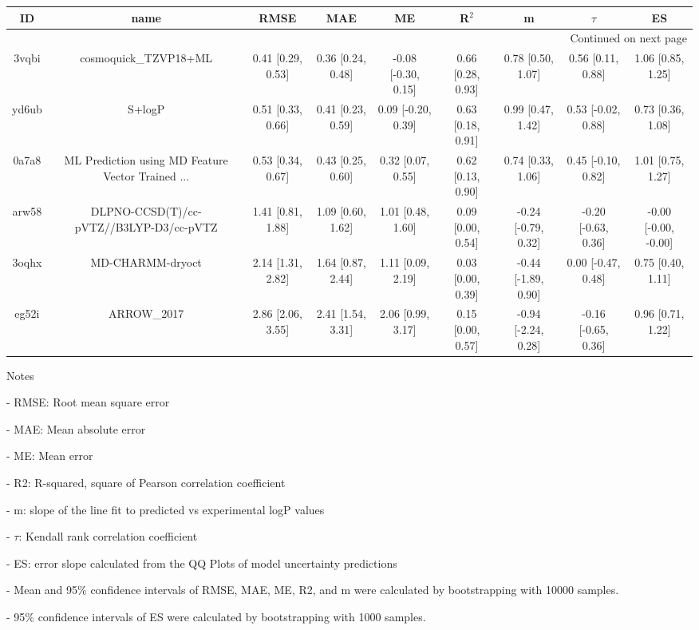 \documentclass{article}
\begin{document}
\begin{center}
\scriptsize
\begin{longtable}{|ccccccccc|}
\toprule
    ID &                                               name &               RMSE &                MAE &                   ME &              R$^2$ &                    m &               $\tau$ &                    ES \\
\midrule
\endhead
\midrule
\multicolumn{9}{r}{{Continued on next page}} \\
\midrule
\endfoot

\bottomrule
\endlastfoot
 3vqbi &                              cosmoquick\_TZVP18+ML &  0.41 [0.29, 0.53] &  0.36 [0.24, 0.48] &  -0.08 [-0.30, 0.15] &  0.66 [0.28, 0.93] &    0.78 [0.50, 1.07] &    0.56 [0.11, 0.88] &     1.06 [0.85, 1.25] \\
 yd6ub &                                             S+logP &  0.51 [0.33, 0.66] &  0.41 [0.23, 0.59] &   0.09 [-0.20, 0.39] &  0.63 [0.18, 0.91] &    0.99 [0.47, 1.42] &   0.53 [-0.02, 0.88] &     0.73 [0.36, 1.08] \\
 0a7a8 &  ML Prediction using MD Feature Vector Trained ... &  0.53 [0.34, 0.67] &  0.43 [0.25, 0.60] &    0.32 [0.07, 0.55] &  0.62 [0.13, 0.90] &    0.74 [0.33, 1.06] &   0.45 [-0.10, 0.82] &     1.01 [0.75, 1.27] \\
 arw58 &            DLPNO-CCSD(T)/cc-pVTZ//B3LYP-D3/cc-pVTZ &  1.41 [0.81, 1.88] &  1.09 [0.60, 1.62] &    1.01 [0.48, 1.60] &  0.09 [0.00, 0.54] &  -0.24 [-0.79, 0.32] &  -0.20 [-0.63, 0.36] &  -0.00 [-0.00, -0.00] \\
 3oqhx &                                   MD-CHARMM-dryoct &  2.14 [1.31, 2.82] &  1.64 [0.87, 2.44] &    1.11 [0.09, 2.19] &  0.03 [0.00, 0.39] &  -0.44 [-1.89, 0.90] &   0.00 [-0.47, 0.48] &     0.75 [0.40, 1.11] \\
 eg52i &                                        ARROW\_2017 &  2.86 [2.06, 3.55] &  2.41 [1.54, 3.31] &    2.06 [0.99, 3.17] &  0.15 [0.00, 0.57] &  -0.94 [-2.24, 0.28] &  -0.16 [-0.65, 0.36] &     0.96 [0.71, 1.22] \\
\end{longtable}
\end{center}

Notes

- RMSE: Root mean square error

- MAE: Mean absolute error

- ME: Mean error

- R2: R-squared, square of Pearson correlation coefficient

- m: slope of the line fit to predicted vs experimental logP values

- $\tau$:  Kendall rank correlation coefficient

- ES: error slope calculated from the QQ Plots of model uncertainty predictions

- Mean and 95\% confidence intervals of RMSE, MAE, ME, R2, and m were calculated by bootstrapping with 10000 samples.

- 95\% confidence intervals of ES were calculated by bootstrapping with 1000 samples.\end{document}
\end{document}
